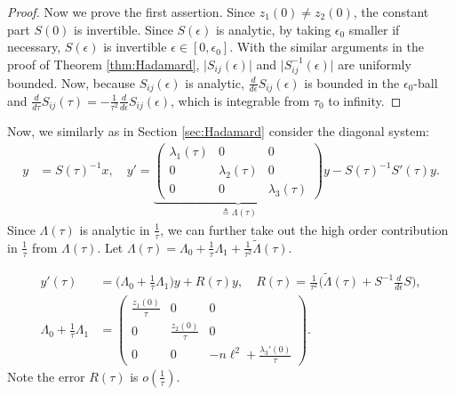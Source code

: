 \documentclass[a4paper,11pt]{article}
\def\l{{\ell}}
\theoremstyle{remark}
\begin{document}
{\begin{proof}
Now we prove the first assertion. Since $z_1(0)\ne z_2(0)$, the constant part $S(0)$ is invertible. Since $S(\epsilon)$ is analytic, by taking $\epsilon_0$ smaller if necessary, $S(\epsilon)$ is invertible $\epsilon\in[0,\epsilon_0]$. With the similar arguments in the proof of Theorem \ref{thm:Hadamard}, $\big|S_{ij}(\epsilon)\big|$ and $\big|S^{-1}_{ij}(\epsilon)\big|$ are uniformly bounded.
Now, because $S_{ij}(\epsilon)$ is analytic, $\frac{d}{d\epsilon}S_{ij}(\epsilon)$ is bounded in the $\epsilon_0$-ball and $\frac{d}{d\tau} S_{ij}(\tau) = -\frac{1}{\tau^2}\frac{d}{d\epsilon} S_{ij}(\epsilon)$, which is integrable from $\tau_0$ to infinity. %
\end{proof}

Now, we similarly as in Section \ref{sec:Hadamard} consider the diagonal system:
\begin{equation*}
\begin{aligned}
 y &= S(\tau)^{-1} x, \quad  y' = \underbrace{\begin{pmatrix} \lambda_1(\tau) & 0 & 0\\0 & \lambda_2(\tau) & 0\\0 & 0 & \lambda_3(\tau)\end{pmatrix}}_{\triangleq \Lambda(\tau)} y - S(\tau)^{-1}S'(\tau) y.
\end{aligned}
\end{equation*}
Since $\Lambda(\tau)$ is analytic in $\frac{1}{\tau}$, we can further take out the high order contribution in $\frac{1}{\tau}$ from $\Lambda(\tau)$. Let $\Lambda(\tau) = \Lambda_0 + \frac{1}{\tau}\Lambda_1 + \frac{1}{\tau^2}\tilde{\Lambda}(\tau)$.

\begin{equation}\label{eq:diagonalsystem}
\begin{aligned}
y'(\tau) &= \Big(\Lambda_0 + \frac{1}{\tau}\Lambda_1\Big) y + R(\tau) y, \quad R(\tau) = \frac{1}{\tau^2}\Big(\tilde{\Lambda}(\tau)+ S^{-1}\frac{d}{d\epsilon}{S}\Big), \\
 \Lambda_0 + \frac{1}{\tau}\Lambda_1 &=
 \begin{pmatrix}
  \frac{z_1(0)}{\tau} & 0 & 0\\
  0 & \frac{z_2(0)}{\tau} & 0\\
  0 & 0 & -n\l^2 + \frac{\lambda_3'(0)}{\tau}
 \end{pmatrix}.
\end{aligned}
\end{equation}
Note the error $R(\tau)$ is $o(\frac{1}{\tau})$. %

}
\end{document}
